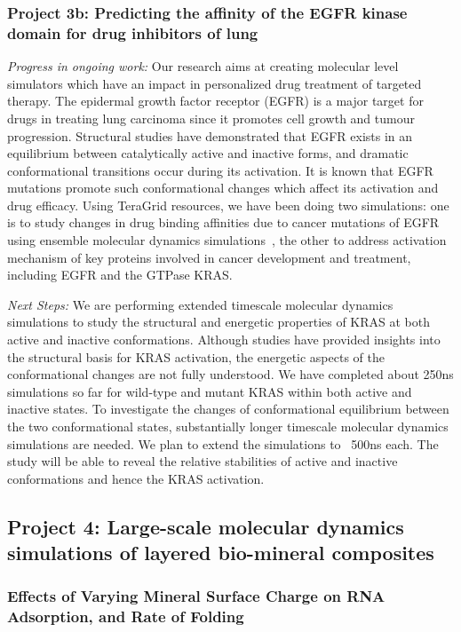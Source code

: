 \documentclass[a4paper,10pt]{article}
\begin{document}
\subsubsection{Project 3b: Predicting the affinity of the EGFR kinase domain for drug inhibitors of lung}


{\it Progress in ongoing work:} Our research aims at creating molecular level simulators which have an impact in personalized drug treatment of targeted therapy. The epidermal growth factor receptor (EGFR) is a major target for drugs in treating lung carcinoma since it promotes cell growth and tumour progression. Structural studies have demonstrated that EGFR exists in an equilibrium between catalytically active and inactive forms, and dramatic conformational transitions occur during its activation. It is known that EGFR mutations promote such conformational changes which affect its activation and drug efficacy. Using TeraGrid resources, we have been doing two simulations: one is to study changes in drug binding affinities due to cancer mutations of EGFR using ensemble molecular dynamics simulations~\cite{Ref6,Ref7,Ref8}, the other to address activation mechanism of key proteins involved in cancer development and treatment, including EGFR and the GTPase KRAS.

{\it Next Steps:} We are performing extended timescale molecular dynamics simulations to study the structural and energetic properties of KRAS at both active and inactive conformations. Although studies have provided insights into the structural basis for KRAS activation, the energetic aspects of the conformational changes are not fully understood. We have completed about 250ns simulations so far for wild-type and mutant KRAS within both active and inactive states. To investigate the changes of conformational equilibrium between the two conformational states, substantially longer timescale molecular dynamics simulations are needed. We plan to extend the simulations to ~500ns each. The study will be able to reveal the relative stabilities of active and inactive conformations and hence the KRAS activation.

\subsection{Project 4: Large-scale molecular dynamics simulations of layered bio-mineral composites}

\subsubsection{Effects of Varying Mineral Surface Charge on RNA Adsorption, and Rate of Folding}
\end{document}
